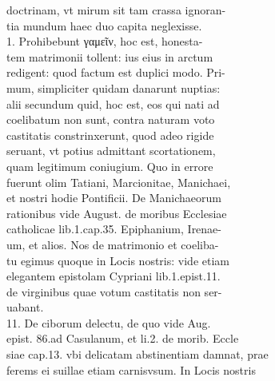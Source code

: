 \documentclass{article}
\begin{document}
\begin{pages}
                doctrinam, vt mirum sit tam crassa ignoran- \\
                tia mundum haec duo capita neglexisse. \\
                1. Prohibebunt γαμεῖν, hoc est, honesta- \\
                tem matrimonii tollent: ius eius in arctum \\
                redigent: quod factum est duplici modo. Pri- \\
                mum, simpliciter quidam danarunt nuptias: \\
                alii secundum quid, hoc est, eos qui nati ad \\
                coelibatum non sunt, contra naturam voto \\
                castitatis constrinxerunt, quod adeo rigide \\
                seruant, vt potius admittant scortationem, \\
                quam legitimum coniugium. Quo in errore \\
                fuerunt olim Tatiani, Marcionitae, Manichaei, \\
                et nostri hodie Pontificii. De Manichaeorum \\
                rationibus vide August. de moribus Ecclesiae \\
                catholicae lib.1.cap.35. Epiphanium, Irenae- \\
                um, et alios. Nos de matrimonio et coeliba- \\
                tu egimus quoque in Locis nostris: vide etiam \\
                elegantem epistolam Cypriani lib.1.epist.11. \\
                de virginibus quae votum castitatis non ser- \\
                uabant. \\
                11. De ciborum delectu, de quo vide Aug. \\
                epist. 86.ad Casulanum, et li.2. de morib. Eccle \\
                siae cap.13. vbi delicatam abstinentiam damnat, prae \\
                ferems ei suillae etiam carnisvsum. In Locis nostris \\

\end{pages}
\end{document}
